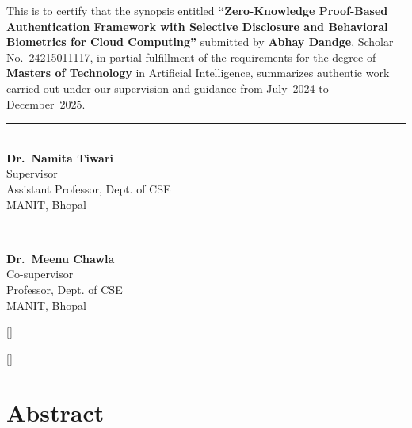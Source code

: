 \documentclass[12pt,a4paper,oneside]{report}
\begin{document}
\vspace{0.5cm}
\noindent This is to certify that the synopsis entitled \textbf{``Zero-Knowledge
Proof-Based Authentication Framework with Selective Disclosure and Behavioral
Biometrics for Cloud Computing''} submitted by \textbf{Abhay Dandge},
Scholar No.~24215011117, in partial fulfillment of the requirements for the
degree of \textbf{Masters of Technology} in Artificial Intelligence, summarizes
authentic work carried out under our supervision and guidance from
July~2024 to December~2025.

\vspace{3cm}
\noindent
\begin{minipage}[t]{0.45\textwidth}
\rule{5.5cm}{0.4pt}\\[3pt]
\textbf{Dr.~Namita Tiwari}\\
Supervisor\\
Assistant Professor, Dept. of CSE\\
MANIT, Bhopal
\end{minipage}
\hfill
\begin{minipage}[t]{0.45\textwidth}
\raggedleft
\rule{5.5cm}{0.4pt}\\[3pt]
\textbf{Dr.~Meenu Chawla}\\
Co-supervisor\\
Professor, Dept. of CSE\\
MANIT, Bhopal
\end{minipage}

[\vspace{1ex}\titlerule]

[\vspace{1ex}\titlerule]

\clearpage
\chapter*{Abstract}
\end{document}
